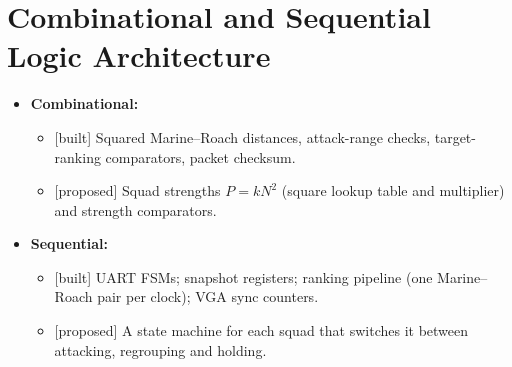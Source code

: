 \documentclass[10pt]{article}
\newcommand{\built}{\textsf{\scriptsize[built]}}
\newcommand{\prop}{\textsf{\scriptsize[proposed]}}
\begin{document}
\section{Combinational and Sequential Logic Architecture}
{\small
\begin{itemize}
\item \textbf{Combinational:}
  \begin{itemize}
  \item \built{} Squared Marine--Roach distances, attack-range checks, target-ranking comparators, packet checksum.
  \item \prop{} Squad strengths $P = kN^2$ (square lookup table and multiplier) and strength comparators.
  \end{itemize}
\item \textbf{Sequential:}
  \begin{itemize}
  \item \built{} UART FSMs; snapshot registers; ranking pipeline (one Marine--Roach pair per clock); VGA sync counters.
  \item \prop{} A state machine for each squad that switches it between attacking, regrouping and holding.
  \end{itemize}
\end{itemize}
}
\end{document}
